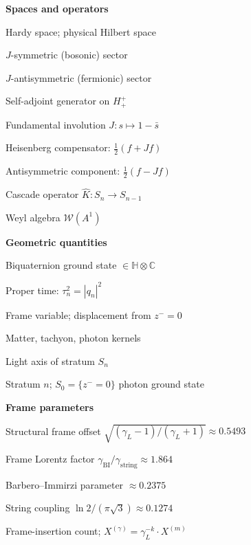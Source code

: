 \documentclass[12pt,a4paper]{article}
\newcommand{\bsym}{\beta_{\mathrm{sym}}}
\newcommand{\gL}{\gamma_L}
\newcommand{\gstring}{\gamma_{\mathrm{string}}}
\newcommand{\gBI}{\gamma_{\mathrm{BI}}}
\newcommand{\zminus}{z^-}
\newcommand{\HH}{\mathbb{H}}
\newcommand{\Hplus}{H^+}
\newcommand{\Hplusplus}{H^+_+}
\newcommand{\Hplusminus}{H^+_-}
\newcommand{\WA}{\mathcal{W}(A^1)}
\newcommand{\KC}{\hat{K}}
\begin{document}
\noindent\begin{minipage}[t]{0.48\textwidth}
\small
\noindent\textbf{Spaces and operators}
\begin{description}[leftmargin=1.8em, labelindent=0pt, itemsep=1pt]
  \item[$\Hplus$] Hardy space; physical Hilbert space
  \item[$\Hplusplus$] $J$-symmetric (bosonic) sector
  \item[$\Hplusminus$] $J$-antisymmetric (fermionic) sector
  \item[$L_0$] Self-adjoint generator on $\Hplusplus$
  \item[$J$] Fundamental involution $J:s\mapsto 1-\bar s$
  \item[$C(f)$] Heisenberg compensator: $\tfrac{1}{2}(f+Jf)$
  \item[$A(f)$] Antisymmetric component: $\tfrac{1}{2}(f-Jf)$
  \item[$\KC$] Cascade operator $\hat K:S_n\to S_{n-1}$
  \item[$\WA$] Weyl algebra $\mathcal{W}(A^1)$
\end{description}

\medskip
\noindent\textbf{Geometric quantities}
\begin{description}[leftmargin=1.8em, labelindent=0pt, itemsep=1pt]
  \item[$q_n$] Biquaternion ground state $\in\HH\otimes\mathbb{C}$
  \item[$\tau_n$] Proper time: $\tau_n^2=|q_n|^2$
  \item[$\zminus$] Frame variable; displacement from $z^-=0$
  \item[$K_1,K_2,K_3$] Matter, tachyon, photon kernels
  \item[$L_n$] Light axis of stratum $S_n$
  \item[$S_n$] Stratum $n$; $S_0=\{z^-=0\}$ photon ground state
\end{description}

\medskip
\noindent\textbf{Frame parameters}
\begin{description}[leftmargin=1.8em, labelindent=0pt, itemsep=1pt]
  \item[$\bsym$] Structural frame offset $\sqrt{(\gL-1)/(\gL+1)}\approx 0.5493$
  \item[$\gL$] Frame Lorentz factor $\gBI/\gstring\approx 1.864$
  \item[$\gBI$] Barbero--Immirzi parameter $\approx 0.2375$
  \item[$\gstring$] String coupling $\ln 2/(\pi\sqrt{3})\approx 0.1274$
  \item[$k(X)$] Frame-insertion count; $X^{(\gamma)}=\gL^{-k}\cdot X^{(m)}$
\end{description}
\end{minipage}
\end{document}
